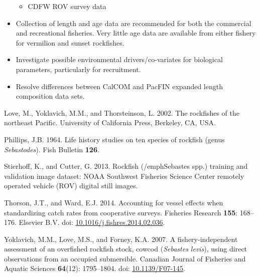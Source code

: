 \documentclass[11pt,
  english,
  a4paper,
]{article}
\newlength{\cslhangindent}
\newenvironment{CSLReferences}[2] %
 {%
  \setlength{\parindent}{0pt}
  \ifodd #1 \everypar{\setlength{\hangindent}{\cslhangindent}}\ignorespaces\fi
  \ifnum #2 > 0
  \setlength{\parskip}{#2\baselineskip}
  \fi
 }%
 {}
\begin{document}
\begin{itemize}
\begin{itemize}
    \tagmcend\tagstructend\tagstructend

    \tagmcend\tagstructend\tagstructend
  \item


    CDFW ROV survey data

    \tagmcend\tagstructend\tagstructend

    \tagmcend\tagstructend\tagstructend
  \end{itemize}

  \tagstructend
\item
  Collection of length and age data are recommended for both the commercial and recreational fisheries. Very little age data are available from either fishery for vermilion and sunset rockfishes.
\item
  Investigate possible environmental drivers/co-variates for biological parameters, particularly for recruitment.
\item
  Resolve differences between CalCOM and PacFIN expanded length composition data sets.
\end{itemize}

\tagstructend

\hypertarget{refs}{}
\begin{CSLReferences}{1}{0}
\leavevmode{}%
Love, M., Yoklavich, M.M., and Thorsteinson, L. 2002. {The rockfishes of the northeast Pacific}. University of California Press, Berkeley, CA, USA.

\leavevmode{}%
Phillips, J.B. 1964. {Life history studies on ten species of rockfish (genus \emph{Sebastodes})}. Fish Bulletin \textbf{126}.

\leavevmode{}%
Stierhoff, K., and Cutter, G. 2013. {Rockfish (/emph{Sebastes spp.}) training and validation image dataset: NOAA Southwest Fisheries Science Center remotely operated vehicle (ROV) digital still images.}

\leavevmode{}%
Thorson, J.T., and Ward, E.J. 2014. {Accounting for vessel effects when standardizing catch rates from cooperative surveys}. Fisheries Research \textbf{155}: 168--176. Elsevier B.V. doi: \href{https://doi.org/10.1016/j.fishres.2014.02.036}{10.1016/j.fishres.2014.02.036}.

\leavevmode{}%
Yoklavich, M.M., Love, M.S., and Forney, K.A. 2007. {A fishery-independent assessment of an overfished rockfish stock, cowcod (\emph{Sebastes levis}), using direct observations from an occupied submersible}. Canadian Journal of Fisheries and Aquatic Sciences \textbf{64}(12): 1795--1804. doi: \href{https://doi.org/10.1139/F07-145}{10.1139/F07-145}.

\end{CSLReferences}
\end{document}
